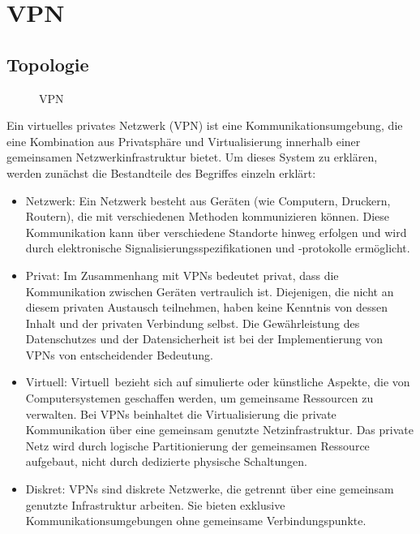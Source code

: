 \section{VPN}

\subsection{Topologie}

\begin{figure}[h!]
    \centering
    
    \caption{VPN}
    \label{imgs:vpn}
\end{figure}

Ein virtuelles privates Netzwerk (VPN) ist eine Kommunikationsumgebung, die eine Kombination aus Privatsphäre und Virtualisierung innerhalb einer gemeinsamen Netzwerkinfrastruktur bietet. Um dieses System zu erklären, werden zunächst die Bestandteile des Begriffes einzeln erklärt:

\begin{itemize}

\item Netzwerk: Ein Netzwerk besteht aus Geräten (wie Computern, Druckern, Routern), die mit verschiedenen Methoden kommunizieren können. Diese Kommunikation kann über verschiedene Standorte hinweg erfolgen und wird durch elektronische Signalisierungsspezifikationen und -protokolle ermöglicht.

\item Privat: Im Zusammenhang mit VPNs bedeutet \glqq privat\grqq, dass die Kommunikation zwischen Geräten vertraulich ist. Diejenigen, die nicht an diesem privaten Austausch teilnehmen, haben keine Kenntnis von dessen Inhalt und der privaten Verbindung selbst. Die Gewährleistung des Datenschutzes und der Datensicherheit ist bei der Implementierung von VPNs von entscheidender Bedeutung.

\item Virtuell: \glqq Virtuell\grqq\ bezieht sich auf simulierte oder künstliche Aspekte, die von Computersystemen geschaffen werden, um gemeinsame Ressourcen zu verwalten. Bei VPNs beinhaltet die Virtualisierung die private Kommunikation über eine gemeinsam genutzte Netzinfrastruktur. Das private Netz wird durch logische Partitionierung der gemeinsamen Ressource aufgebaut, nicht durch dedizierte physische Schaltungen.

\item Diskret: VPNs sind diskrete Netzwerke, die getrennt über eine gemeinsam genutzte Infrastruktur arbeiten. Sie bieten exklusive Kommunikationsumgebungen ohne gemeinsame Verbindungspunkte.

\end{itemize}

